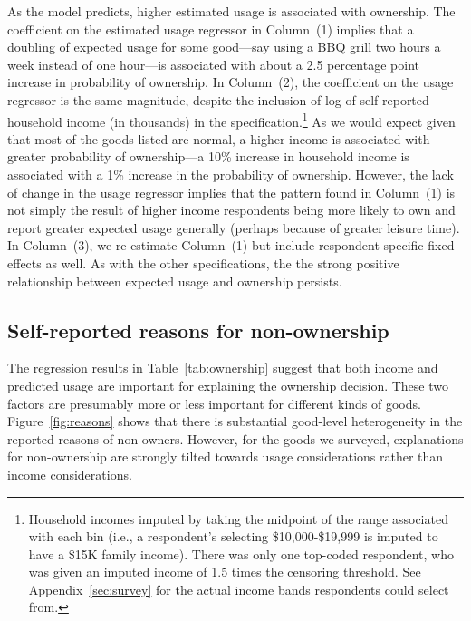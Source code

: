 \documentclass[11pt]{article}
\begin{document}
As the model predicts, higher estimated usage is associated with ownership.
The coefficient on the estimated usage regressor in Column~(1) implies that a doubling of expected usage for some good---say using a BBQ grill two hours a week instead of one hour---is associated with about a 2.5 percentage point increase in probability of ownership. 
In Column~(2), the coefficient on the usage regressor is the same magnitude, despite the inclusion of log of self-reported household income (in thousands) in the specification.\footnote{
  Household incomes imputed by taking the midpoint of the range associated with each bin (i.e., a respondent's selecting \$10,000-\$19,999 is imputed to have a \$15K family income).
  There was only one top-coded respondent, who was given an imputed income of 1.5 times the censoring threshold.
  See Appendix~\ref{sec:survey} for the actual income bands respondents could select from.
  }
As we would expect given that most of the goods listed are normal, a higher income is associated with greater probability of ownership---a 10\% increase in household income is associated with a 1\% increase in the probability of ownership.  
However, the lack of change in the usage regressor implies that the pattern found in Column~(1) is not simply the result of higher income respondents being more likely to own and report greater expected usage generally (perhaps because of greater leisure time). 
In Column~(3), we re-estimate Column~(1) but include respondent-specific fixed effects as well.
As with the other specifications, the the strong positive relationship between expected usage and ownership persists. 

\subsection{Self-reported reasons for non-ownership}

The regression results in Table~\ref{tab:ownership} suggest that both income and predicted usage are important for explaining the ownership decision. 
These two factors are presumably more or less important for different kinds of goods.
Figure~\ref{fig:reasons} shows that there is substantial good-level heterogeneity in the reported reasons of non-owners.
However, for the goods we surveyed, explanations for non-ownership are strongly tilted towards usage considerations rather than income considerations.
\end{document}
